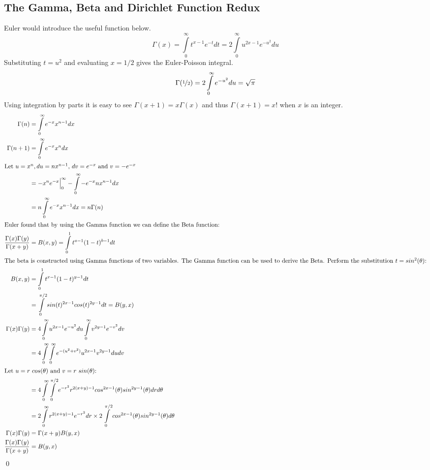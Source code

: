 \documentclass{article}%
\theoremstyle{definition}
\begin{document}
\subsection{The Gamma, Beta and Dirichlet Function Redux}
Euler would introduce the useful function below. 
\[\Gamma(x) = \int\limits_{0}^{\infty}t^{x-1}e^{-t}dt = 2\int\limits_{0}^{\infty}u^{2x-1}e^{-u^2}du \]
Substituting $t = u^2$ and evaluating $x = 1/2$ gives the Euler-Poisson integral. 
\[\Gamma(\nicefrac{1}{2}) = 2\int\limits_{0}^{\infty}e^{-u^2}du = \sqrt{\pi}\]
Using integration by parts it is easy to see $\Gamma(x+1) = x\Gamma(x)$ and thus $\Gamma(x+1) = x!$ when $x$ is an integer. 
\begin{align*}
\Gamma(n) &= \int\limits_{0}^{\infty}e^{-x}x^{n-1}dx \\
\Gamma(n+1) &= \int\limits_{0}^{\infty}e^{-x}x^{n}dx \\
\intertext{Let $u=x^n, du = nx^{n-1}$, $dv=e^{-x}$ and $v=-e^{-x}$}
&= -x^{n}e^{-x}\Big|_0^{\infty} - \int\limits_{0}^{\infty}-e^{-x}nx^{n-1}dx \\
&= n \int\limits_{0}^{\infty}e^{-x}x^{n-1}dx = n\Gamma(n) \\
\intertext{Euler found that by using the Gamma function we can define the Beta function:}
\frac{\Gamma(x)\Gamma(y)}{\Gamma(x+y)} &= B(x,y) = \int\limits_{0}^{1}t^{a-1} (1-t)^{b-1}dt \\
\intertext{The beta is constructed using Gamma functions of two variables. The Gamma function can be used to derive the Beta. Perform the substitution $t = sin^2(\theta)$:}
B(x,y) &= \int\limits_{0}^{1}t^{x-1}(1-t)^{y-1}dt 
\\&= \int \limits_{0}^{\pi/2}sin(t)^{2x-1}cos(t)^{2y-1}dt = B(y,x)\\
\Gamma(x)\Gamma(y) &= 4 \int\limits_{0}^{\infty}u^{2x-1}e^{-u^2}du\int\limits_{0}^{\infty}v^{2y-1}e^{-v^2}dv \\
&= 4 \int\limits_{0}^{\infty}\int\limits_{0}^{\infty}e^{-(u^2+v^2)}u^{2x-1}v^{2y-1}du dv \\
\intertext{Let $u = r \ cos (\theta)$  and $v = r \ sin (\theta)$:}
&= 4 \int\limits_{0}^{\infty}\int\limits_{0}^{\pi/2}e^{-r^2}r^{2(x+y)-1}cos^{2x-1}(\theta)sin^{2y-1}(\theta) dr d\theta \\
&= 2 \int\limits_{0}^{\infty}r^{2(x+y)-1}e^{-r^2}dr \times 2\int\limits_{0}^{\pi/2}cos^{2x-1}(\theta)sin^{2y-1}(\theta) d\theta \\
\Gamma(x)\Gamma(y)&= \Gamma(x+y)B(y,x) \\
\frac{\Gamma(x)\Gamma(y)}{\Gamma(x+y)} &= B(y,x)
\end{align*}
\qed
\end{document}

